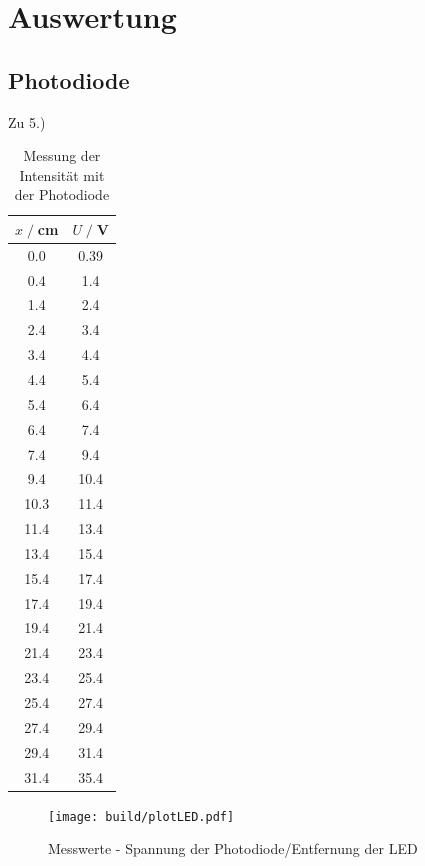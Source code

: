 \newpage
\section{Auswertung}
\label{sec:Auswertung}
\subsection{Photodiode}
Zu 5.)\\

\begin{table}
    \centering
    \begin{tabular}{c c}
        \toprule
        $x\;/\;$cm & $U\;/\;$V\\
        \midrule
        0.0 & 0.39 \\ 
        0.4 & 1.4 \\ 
        1.4 & 2.4 \\ 
        2.4 & 3.4 \\ 
        3.4 & 4.4 \\ 
        4.4 & 5.4 \\ 
        5.4 & 6.4 \\ 
        6.4 & 7.4 \\ 
        7.4 & 9.4 \\ 
        9.4 & 10.4 \\ 
        10.3 & 11.4 \\ 
        11.4 & 13.4 \\ 
        13.4 & 15.4 \\ 
        15.4 & 17.4 \\ 
        17.4 & 19.4 \\ 
        19.4 & 21.4 \\ 
        21.4 & 23.4 \\ 
        23.4 & 25.4 \\ 
        25.4 & 27.4 \\ 
        27.4 & 29.4 \\ 
        29.4 & 31.4 \\ 
        31.4 & 35.4 \\
        \bottomrule
    \end{tabular}
    \caption{Messung der Intensität mit der Photodiode}
    \label{tab:LED_werte}
\end{table}

\begin{figure}
    \centering
    \texttt{[image: build/plotLED.pdf]}
    \caption{Messwerte - Spannung der Photodiode/Entfernung der LED}        
    \label{fig:plotLED}
\end{figure}


